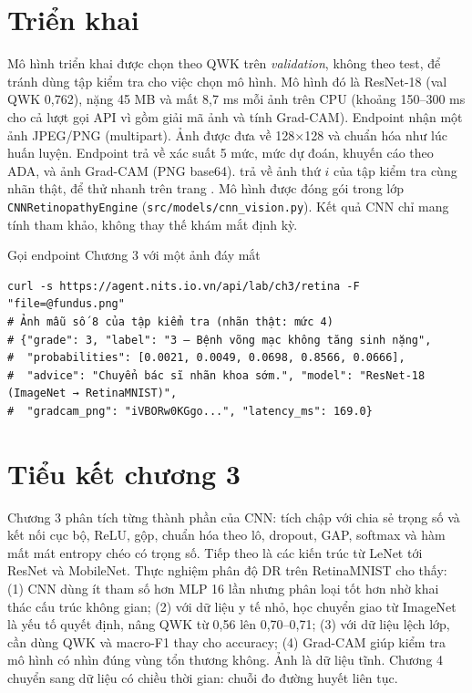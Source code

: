\section{Triển khai}

Mô hình triển khai được chọn theo QWK trên \emph{validation}, không theo test, để tránh dùng tập kiểm tra cho việc chọn mô hình. Mô hình đó là ResNet-18 (val QWK 0,762), nặng 45 MB và mất 8,7 ms mỗi ảnh trên CPU (khoảng 150–300 ms cho cả lượt gọi API vì gồm giải mã ảnh và tính Grad-CAM). Endpoint  nhận một ảnh JPEG/PNG (multipart). Ảnh được đưa về 128×128 và chuẩn hóa như lúc huấn luyện. Endpoint trả về xác suất 5 mức, mức dự đoán, khuyến cáo theo ADA, và ảnh Grad-CAM (PNG base64).  trả về ảnh thứ $i$ của tập kiểm tra cùng nhãn thật, để thử nhanh trên trang . Mô hình được đóng gói trong lớp \texttt{CNNRetinopathyEngine} (\texttt{src/models/cnn\_vision.py}). Kết quả CNN chỉ mang tính tham khảo, không thay thế khám mắt định kỳ.

\begin{code}{Gọi endpoint Chương 3 với một ảnh đáy mắt}
\label{lst:ch3-api}
\begin{verbatim}
curl -s https://agent.nits.io.vn/api/lab/ch3/retina -F "file=@fundus.png"
# Ảnh mẫu số 8 của tập kiểm tra (nhãn thật: mức 4)
# {"grade": 3, "label": "3 – Bệnh võng mạc không tăng sinh nặng",
#  "probabilities": [0.0021, 0.0049, 0.0698, 0.8566, 0.0666],
#  "advice": "Chuyển bác sĩ nhãn khoa sớm.", "model": "ResNet-18 (ImageNet → RetinaMNIST)",
#  "gradcam_png": "iVBORw0KGgo...", "latency_ms": 169.0}
\end{verbatim}
\end{code}

\section{Tiểu kết chương 3}

Chương 3 phân tích từng thành phần của CNN: tích chập với chia sẻ trọng số và kết nối cục bộ, ReLU, gộp, chuẩn hóa theo lô, dropout, GAP, softmax và hàm mất mát entropy chéo có trọng số. Tiếp theo là các kiến trúc từ LeNet tới ResNet và MobileNet. Thực nghiệm phân độ DR trên RetinaMNIST cho thấy: (1) CNN dùng ít tham số hơn MLP 16 lần nhưng phân loại tốt hơn nhờ khai thác cấu trúc không gian; (2) với dữ liệu y tế nhỏ, học chuyển giao từ ImageNet là yếu tố quyết định, nâng QWK từ 0,56 lên 0,70–0,71; (3) với dữ liệu lệch lớp, cần dùng QWK và macro-F1 thay cho accuracy; (4) Grad-CAM giúp kiểm tra mô hình có nhìn đúng vùng tổn thương không. Ảnh là dữ liệu tĩnh. Chương 4 chuyển sang dữ liệu có chiều thời gian: chuỗi đo đường huyết liên tục.
